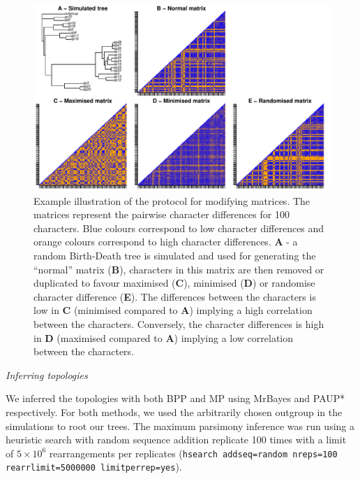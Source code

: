 \documentclass[12pt,letterpaper]{article}
\renewcommand{\subsection}[1]{%
\bigskip
\begin{center}
\begin{large}
\normalfont\itshape #1
\end{large}
\end{center}}
\begin{document}
\begin{figure}[!htbp]
\centering
   \includegraphics[width=1\textwidth]{Figures/Modif_matrix.pdf}
\caption{Example illustration of the protocol for modifying matrices. The matrices represent the pairwise character differences for 100 characters. Blue colours correspond to low character differences and orange colours correspond to high character differences. \textbf{A} - a random Birth-Death tree is simulated and used for generating the ``normal'' matrix (\textbf{B}), characters in this matrix are then removed or duplicated to favour maximised (\textbf{C}), minimised (\textbf{D}) or randomise character difference (\textbf{E}). The differences between the characters is low in \textbf{C} (minimised compared to \textbf{A}) implying a high correlation between the characters. Conversely, the character differences is high in \textbf{D} (maximised compared to \textbf{A}) implying a low correlation between the characters.}
\label{Fig:modif_matrix}
\end{figure}

\subsection{Inferring topologies}
We inferred the topologies with both BPP and MP using MrBayes \citep[v3.2.6;][]{Ronquist2012mrbayes} and PAUP* \citep[v4.0a151;][]{swofford2001paup} respectively.
For both methods, we used the arbitrarily chosen outgroup in the simulations to root our trees.
The maximum parsimony inference was run using a heuristic search with random sequence addition replicate 100 times with a limit of $5\times10^6$ rearrangements per replicates (\texttt{hsearch addseq=random nreps=100 rearrlimit=5000000 limitperrep=yes}).
\end{document}
